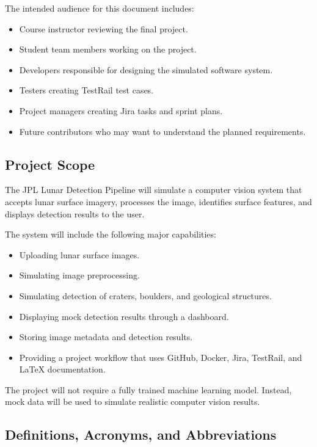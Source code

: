 \documentclass[12pt]{article}
\begin{document}
The intended audience for this document includes:

\begin{itemize}
    \item Course instructor reviewing the final project.
    \item Student team members working on the project.
    \item Developers responsible for designing the simulated software system.
    \item Testers creating TestRail test cases.
    \item Project managers creating Jira tasks and sprint plans.
    \item Future contributors who may want to understand the planned requirements.
\end{itemize}

\subsection{Project Scope}

The JPL Lunar Detection Pipeline will simulate a computer vision system that accepts lunar surface imagery, processes the image, identifies surface features, and displays detection results to the user.

The system will include the following major capabilities:

\begin{itemize}
    \item Uploading lunar surface images.
    \item Simulating image preprocessing.
    \item Simulating detection of craters, boulders, and geological structures.
    \item Displaying mock detection results through a dashboard.
    \item Storing image metadata and detection results.
    \item Providing a project workflow that uses GitHub, Docker, Jira, TestRail, and LaTeX documentation.
\end{itemize}

The project will not require a fully trained machine learning model. Instead, mock data will be used to simulate realistic computer vision results.

\subsection{Definitions, Acronyms, and Abbreviations}
\end{document}
